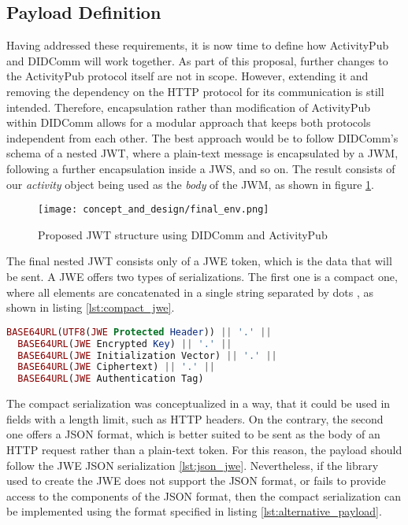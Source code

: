 \subsection{Payload Definition}\label{subsec:payload_definition}

Having addressed these requirements, it is now time to define how ActivityPub and DIDComm will work together. As part of this proposal, further changes to the ActivityPub protocol itself are not in scope. However, extending it and removing the dependency on the HTTP protocol for its communication is still intended. Therefore, encapsulation rather than modification of ActivityPub within DIDComm allows for a modular approach that keeps both protocols independent from each other. The best approach would be to follow DIDComm's schema of a nested JWT, where a plain-text message is encapsulated by a JWM, following a further encapsulation inside a JWS, and so on. The result consists of our \emph{activity} object being used as the \emph{body} of the JWM, as shown in figure \ref{fig:final_env}. 

\begin{figure}[h]
  \centering
  \texttt{[image: concept\_and\_design/final\_env.png]}
  \caption{Proposed JWT structure using DIDComm and ActivityPub}
  \label{fig:final_env}
\end{figure}

The final nested JWT consists only of a JWE token, which is the data that will be sent. A JWE offers two types of serializations. The first one is a compact one, where all elements are concatenated in a single string separated by dots \cite{jones_hildebrand_2015}, as shown in listing \ref{lst:compact_jwe}. 

\lstset{style=JSONStyle}
\begin{lstlisting}[language=PHP, caption=JWE compact serialization \cite{jones_hildebrand_2015}, label=lst:compact_jwe, float=h!]
  BASE64URL(UTF8(JWE Protected Header)) || '.' ||
  BASE64URL(JWE Encrypted Key) || '.' ||
  BASE64URL(JWE Initialization Vector) || '.' ||
  BASE64URL(JWE Ciphertext) || '.' ||
  BASE64URL(JWE Authentication Tag)
\end{lstlisting}

The compact serialization was conceptualized in a way, that it could be used in fields with a length limit, such as HTTP headers. On the contrary, the second one offers a JSON format, which is better suited to be sent as the body of an HTTP request rather than a plain-text token. For this reason, the payload should follow the JWE JSON serialization \ref{lst:json_jwe}. Nevertheless, if the library used to create the JWE does not support the JSON format, or fails to provide access to the components of the JSON format, then the compact serialization can be implemented using the format specified in listing \ref{lst:alternative_payload}.

